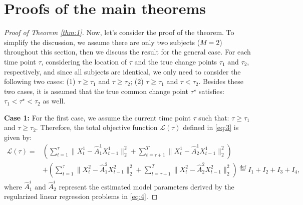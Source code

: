 \documentclass[11pt]{article}
\begin{document}
\section{Proofs of the main theorems}
\begin{proof}[Proof of Theorem \ref{thm:1}]
Now, let's consider the proof of the theorem. To simplify the discussion, we assume there are only two subjects ($M=2$) throughout this section, then we discuss the result for the general case. For each time point $\tau$, considering the location of $\tau$ and the true change points $\tau_1$ and $\tau_2$, respectively, and since all subjects are identical, we only need to consider the following two cases: (1) $\tau \geq \tau_1$ and $\tau \geq \tau_2$; (2) $\tau \geq \tau_1$ and $\tau < \tau_2$. Besides these two cases, it is assumed that the true common change point $\tau^\star$ satisfies: $\tau_1 < \tau^\star < \tau_2$ as well.

\noindent
\textbf{Case 1:}
For the first case, we assume the current time point $\tau$ such that: $\tau \geq \tau_1$ and $\tau \geq \tau_2$. Therefore, the total objective function $\mathcal{L}(\tau)$ defined in \eqref{eq:3} is given by:
\begin{equation}
    \label{eq:6}
    \begin{aligned}
        \mathcal{L}(\tau) = &\left(\sum_{t=1}^\tau\|X_t^1 - \widehat{A}_1^1X_{t-1}^1\|_2^2 + \sum_{t=\tau+1}^T\|X_t^1 - \widehat{A}_2^1X_{t-1}^1\|_2^2\right) \\
        &+ \left(\sum_{t=1}^\tau\|X_t^2 - \widehat{A}_1^2X_{t-1}^2\|_2^2 + \sum_{t=\tau+1}^T\|X_t^2 - \widehat{A}_2^2X_{t-1}^2\|_2^2\right) \overset{\text{def}}{=} I_1 + I_2 + I_3 + I_4,
    \end{aligned}
\end{equation}
where $\widehat{A}_1^i$ and $\widehat{A}_2^i$ represent the estimated model parameters derived by the regularized linear regression problems in \eqref{eq:4}. 


\end{proof}
\end{document}
